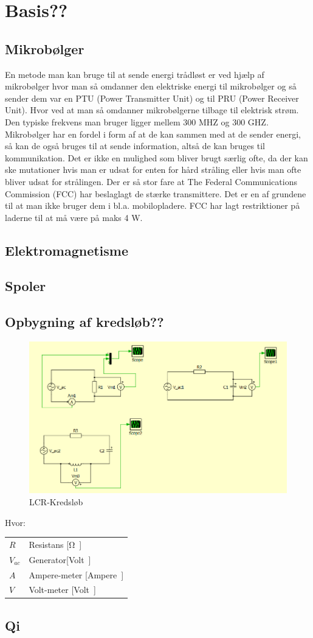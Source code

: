 \section{Basis??}
\subsection{Mikrobølger}
En metode man kan bruge til at sende energi trådløst er ved hjælp af mikrobølger hvor man så omdanner den elektriske energi til mikrobølger og så sender dem var en PTU (Power Transmitter Unit) og til PRU (Power Receiver Unit). Hvor ved at man så omdanner mikrobølgerne tilbage til elektrisk strøm. Den typiske frekvens man bruger ligger mellem 300 MHZ og 300 GHZ. Mikrobølger har en fordel i form af at de kan sammen med at de sender energi, så kan de også bruges til at sende information, altså de kan bruges til kommunikation.  Det er ikke en mulighed som bliver brugt særlig ofte, da der kan ske mutationer hvis man er udsat for enten for hård stråling eller hvis man ofte bliver udsat for strålingen. Der er så stor fare at The Federal Communications Commission (FCC) har beslaglagt de stærke transmittere. Det er en af grundene til at man ikke bruger dem i bl.a. mobilopladere. FCC har lagt restriktioner på laderne til at må være på maks 4 W.
\subsection{Elektromagnetisme}
\subsection{Spoler}
\subsection{Opbygning af kredsløb??}
\begin{figure}[htbp]
	\centering
	\includegraphics[width=1\textwidth]{../Vildledning/Schematics/Eks1_LCR.png}
	\caption{LCR-Kredsløb}
\end{figure}
Hvor:
\begin{table}[H]
	\begin{tabular}{l|l}
	$R$     & Resistans [\si \ohm] \\
	$V_{ac}$ 	   &  Generator[\si Volt] \\
	$A$ 	   & Ampere-meter [\si Ampere] \\
	$V$			& Volt-meter [\si Volt]
	\end{tabular}
\end{table}

\subsection{Qi}
